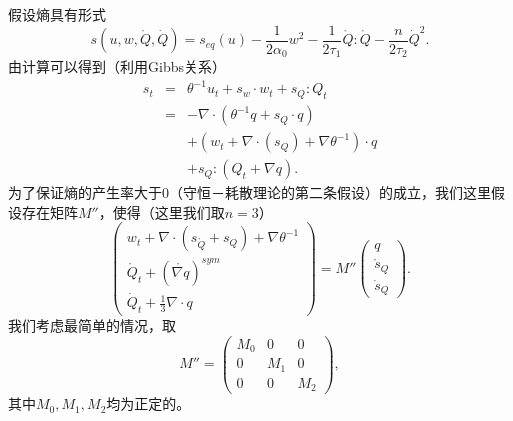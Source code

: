 假设熵具有形式
\begin{equation*}
s(u,{w},\mathring{{Q}},\dot{Q})=s_{eq}(u)-\frac{1}{2 \alpha_0}{w}^2-\frac{1}{2\tau_1} {\mathring{{Q}}}:{\mathring{{Q}}}-\frac{n}{2\tau_2}\dot{Q}^2.
\end{equation*}
由计算可以得到（利用Gibbs关系）
\begin{eqnarray*}
s_t &=&%
    \theta^{-1} u_t +s_{w} \cdot {w}_t + s_Q: {Q}_t \\
    &=& -\nabla \cdot (\theta^{-1} {q}+ s_Q \cdot {q})\\
    	&&+({w}_t+\nabla \cdot (s_Q)+\nabla \theta^{-1}) \cdot {q} \\
&& +s_Q:(Q_t + \nabla q).
\end{eqnarray*}
为了保证熵的产生率大于0（守恒－耗散理论的第二条假设）的成立，我们这里假设存在矩阵$M''$，使得（这里我们取$n=3$）
\begin{equation*}
\left( \begin{array}{ll} {w}_t+\nabla \cdot (s_{\mathring{{Q}}}+s_Q)+\nabla \theta^{-1} \\ \mathring{{Q}}_t+(\mathring{\nabla {q}})^{sym} \\ \dot{Q}_t+\frac{1}{3} \nabla \cdot {q} \end{array} \right) = M'' \left( \begin{array}{l} {q} \\ \mathring{s}_Q \\\dot{s}_Q \end{array} \right).
\end{equation*}
我们考虑最简单的情况，取
\begin{equation*}
	M''=\left( \begin{array}{lll} M_0 & 0 & 0 \\0 & M_1 & 0 \\0 & 0 & M_2 \end{array} \right),
\end{equation*}
其中$M_0,M_1,M_2$均为正定的。

